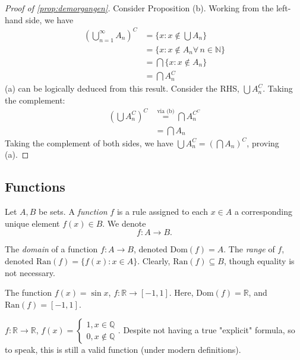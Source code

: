 \documentclass[12pt]{article}
\begin{document}
\begin{proof}[Proof of \cref{prop:demorgangen}]
  Consider Proposition (b). Working from the left-hand side, we have
  \begin{align*}
    \left(\bigcup_{n=1}^\infty A_n\right)^C &= \{x : x \notin \bigcup A_n\}\\
    &= \{x : x\notin A_n \forall\, n \in \mathbb{N}\}\\
    &= \bigcap \{x : x \notin A_n\}\\
    &= \bigcap A_n^C
  \end{align*}
  (a) can be logically deduced from this result. Consider the RHS, $\bigcup A_n^C$. Taking the complement:
  \begin{align*}
    \left(\bigcup A_n^C\right)^C &\overset{\text{via (b)}}{=} \bigcap A_n^{C^C}\\
    &= \bigcap A_n
  \end{align*}
  Taking the complement of both sides, we have $\bigcup A_n^C = \left(\bigcap A_n\right)^C$, proving (a). 
\end{proof}

\subsection{Functions}
\begin{definition}
  Let $A, B$ be sets. A \emph{function} $f$ is a rule assigned to each $x \in A$ a corresponding unique element $f(x) \in B$. We denote \[f: A \to B.\]
\end{definition}
\begin{definition}
  The \emph{domain} of a function $f: A \to B$, denoted $\text{Dom}(f) = A$. The \emph{range} of $f$, denoted $\text{Ran}(f) = \{f(x) : x \in A\}$. Clearly, $\text{Ran}(f) \subseteq B$, though equality is not necessary.
\end{definition}
\begin{example}
  The function $f(x) = \sin x$, $f: \mathbb{R} \to [-1, 1]$. Here, $\text{Dom}(f) = \mathbb{R}$, and $\text{Ran}(f) = [-1, 1]$.
\end{example}
\begin{example}\footnotemark
  $f:\mathbb{R} \to \mathbb{R}$, $f(x) = \begin{cases}
    1, x \in \mathbb{Q}\\
    0, x \notin \mathbb{Q}
  \end{cases}$. Despite not having a true "explicit" formula, so to speak, this is still a valid function (under modern definitions).
\end{example}
\end{document}
